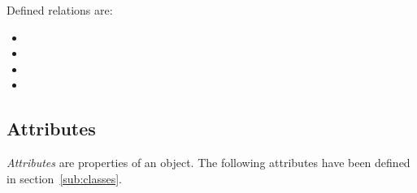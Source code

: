 Defined relations are:
\begin{itemize}
    \item {}
    \item {}
    \item {}
    \item {}
\end{itemize}


\subsection{Attributes}
\label{sub:attributes}

\emph{Attributes} are properties of an object. The following attributes have been defined in section~\ref{sub:classes}.

